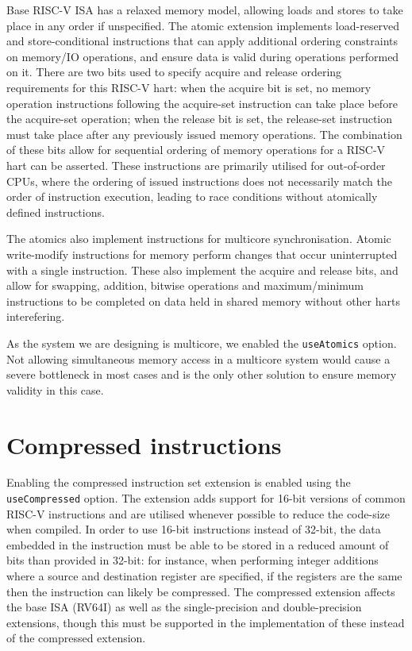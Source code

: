 Base RISC-V ISA has a relaxed memory model, allowing loads and stores to take place in any order if unspecified. The atomic extension implements load-reserved and store-conditional instructions that can apply additional ordering constraints on memory/IO operations, and ensure data is valid during operations performed on it. There are two bits used to specify acquire and release ordering requirements for this RISC-V hart: when the acquire bit is set, no memory operation instructions following the acquire-set instruction can take place before the acquire-set operation; when the release bit is set, the release-set instruction must take place after any previously issued memory operations. The combination of these bits allow for sequential ordering of memory operations for a RISC-V hart can be asserted. These instructions are primarily utilised for out-of-order CPUs, where the ordering of issued instructions does not necessarily match the order of instruction execution, leading to race conditions without atomically defined instructions.

The atomics also implement instructions for multicore synchronisation. Atomic write-modify instructions for memory perform changes that occur uninterrupted with a single instruction. These also implement the acquire and release bits, and allow for swapping, addition, bitwise operations and maximum/minimum instructions to be completed on data held in shared memory without other harts interefering.

As the system we are designing is multicore, we enabled the \texttt{useAtomics} option. Not allowing simultaneous memory access in a multicore system would cause a severe bottleneck in most cases and is the only other solution to ensure memory validity in this case.

\section{Compressed instructions}
Enabling the compressed instruction set extension is enabled using the \texttt{useCompressed} option. The extension adds support for 16-bit versions of common RISC-V instructions and are utilised whenever possible to reduce the code-size when compiled. In order to use 16-bit instructions instead of 32-bit, the data embedded in the instruction must be able to be stored in a reduced amount of bits than provided in 32-bit: for instance, when performing integer additions where a source and destination register are specified, if the registers are the same then the instruction can likely be compressed. The compressed extension affects the base ISA (RV64I) as well as the single-precision and double-precision extensions, though this must be supported in the implementation of these instead of the compressed extension.

